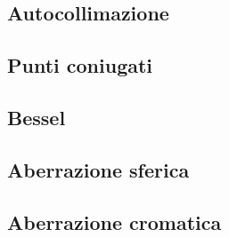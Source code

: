 \FloatBarrier
\subsection{Autocollimazione}

\FloatBarrier
\subsection{Punti coniugati}

\FloatBarrier
\subsection{Bessel}

\FloatBarrier
\subsection{Aberrazione sferica}

\FloatBarrier
\subsection{Aberrazione cromatica}

